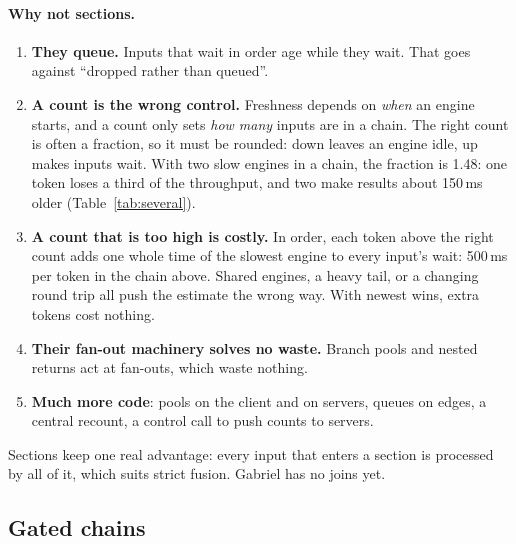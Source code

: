 \documentclass[11pt]{article}
\begin{document}
\paragraph{Why not sections.}
\begin{enumerate}[nosep]
  \item \textbf{They queue.} Inputs that wait in order age while they wait.
        That goes against ``dropped rather than queued''.
  \item \textbf{A count is the wrong control.} Freshness depends on
        \emph{when} an engine starts, and a count only sets \emph{how many}
        inputs are in a chain. The right count is often a fraction, so it
        must be rounded: down leaves an engine idle, up makes inputs wait.
        With two slow engines in a chain, the fraction is 1.48: one token
        loses a third of the throughput, and two make results about 150\,ms
        older (Table~\ref{tab:several}).
  \item \textbf{A count that is too high is costly.} In order, each token
        above the right count adds one whole time of the slowest engine to
        every input's wait: 500\,ms per token in the chain above. Shared
        engines, a heavy tail, or a changing round trip all push the
        estimate the wrong way. With newest wins, extra tokens cost nothing.
  \item \textbf{Their fan-out machinery solves no waste.} Branch pools and
        nested returns act at fan-outs, which waste nothing.
  \item \textbf{Much more code}: pools on the client and on servers, queues
        on edges, a central recount, a control call to push counts to
        servers.
\end{enumerate}
Sections keep one real advantage: every input that enters a section is
processed by all of it, which suits strict fusion. Gabriel has no joins yet.

\subsection{Gated chains}
\label{sec:gated}
\end{document}
